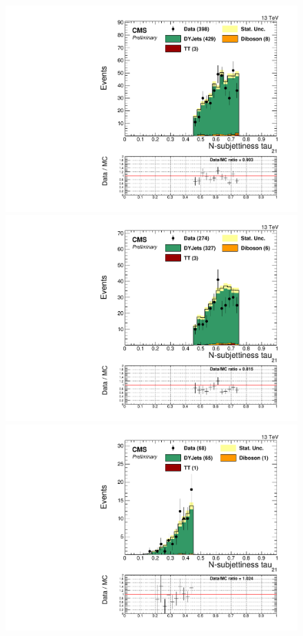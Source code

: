 \begin{figure}[h]
\begin{center}
\includegraphics[scale=0.37]{figures/control/tau21MLP.pdf}
\includegraphics[scale=0.37]{figures/control/tau21ELP.pdf}\\[2cm]
\includegraphics[scale=0.37]{figures/control/tau21MHP.pdf}

\end{center}
\end{figure}
